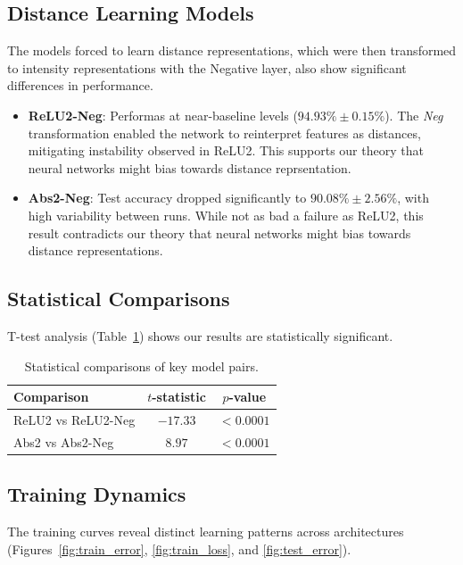 \subsection{Distance Learning Models}
The models forced to learn distance representations, which were then transformed to intensity representations with the Negative layer, also show significant differences in performance.
\begin{itemize}
    \item \textbf{ReLU2-Neg}: Performas at near-baseline levels ($94.93\% \pm 0.15\%$). The \textit{Neg} transformation enabled the network to reinterpret features as distances, mitigating instability observed in ReLU2. This supports our theory that neural networks might bias towards distance reprsentation.
    \item \textbf{Abs2-Neg}: Test accuracy dropped significantly to $90.08\% \pm 2.56\%$, with high variability between runs. While not as bad a failure as ReLU2, this result contradicts our theory that neural networks might bias towards distance representations.
\end{itemize}

\subsection{Statistical Comparisons}
T-test analysis (Table~\ref{tab:ttest_results}) shows our results are statistically significant.

\begin{table}[ht]
\centering
\begin{tabular}{lcc}
\toprule
\textbf{Comparison} & \textbf{$t$-statistic} & \textbf{$p$-value} \\
\midrule
ReLU2 vs ReLU2-Neg & $-17.33$ & $< 0.0001$ \\
Abs2 vs Abs2-Neg & $8.97$ & $< 0.0001$ \\
\bottomrule
\end{tabular}
\caption{Statistical comparisons of key model pairs.}
\label{tab:ttest_results}
\end{table}

\subsection{Training Dynamics}
The training curves reveal distinct learning patterns across architectures (Figures~\ref{fig:train_error}, \ref{fig:train_loss}, and \ref{fig:test_error}). 

